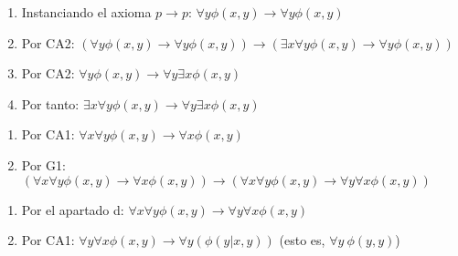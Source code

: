 \begin{problem}
\begin{enumerate}
\end{enumerate}

\spart

\begin{enumerate}
	\item Instanciando el axioma $p \to p$:  $\forall y \phi (x,y)  \to \forall y \phi (x,y)$
	\item Por CA2: $(\forall y \phi (x,y)  \to \forall y \phi (x,y))\to (\exists x \forall y \phi (x,y)  \to  \forall y \phi(x,y))$
	\item  Por CA2:  $ \forall y \phi(x,y) \to \forall y \exists x \phi(x,y) $
	\item Por tanto:  $ \exists x \forall y \phi (x,y) \to \forall y \exists x \phi (x,y) $
\end{enumerate}

\spart

\begin{enumerate}
	\item Por CA1: $ \forall x \forall y \phi (x,y) \to \forall x \phi (x,y)$
	\item Por G1: $ (\forall x \forall y \phi (x,y) \to \forall x \phi (x,y)) \to (\forall x \forall y \phi (x,y) \to \forall y \forall x \phi (x,y))$
\end{enumerate}

\spart


\begin{enumerate}
	\item Por el apartado d: $ \forall x \forall y \phi (x,y) \to \forall y \forall x \phi (x,y)$
	\item Por CA1: $\forall y \forall x \phi (x,y) \to \forall y (\phi (y|x, y))$ (esto es, $\forall y~\phi (y,y)$)
\end{enumerate}

\end{problem}